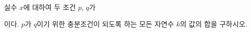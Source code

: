 실수 $x$에 대하여 두 조건 $p$, $q$가\par\smallskip{}\par\smallskip\noindent 이다. $p$가 $q$이기 위한 충분조건이 되도록 하는 모든 자연수 $k$의 값의 합을 구하시오.
